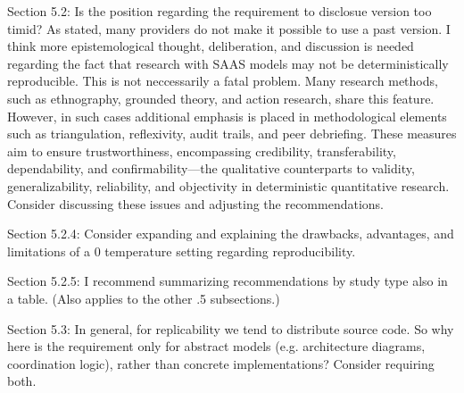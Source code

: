 \documentclass[12pt,english]{reviewresponse}
\begin{document}
\begin{revcomment}
Section 5.2: Is the position regarding the requirement to disclosue version too timid? As stated, many providers do not make it possible to use a past version. I think more epistemological thought, deliberation, and discussion is needed regarding the fact that research with SAAS models may not be deterministically reproducible.  This is not neccessarily a fatal problem. Many research methods, such as ethnography, grounded theory, and action research, share this feature. However, in such cases additional emphasis is placed in methodological elements such as triangulation, reflexivity, audit trails, and peer debriefing. These measures aim to ensure trustworthiness, encompassing credibility, transferability, dependability, and confirmability—the qualitative counterparts to validity, generalizability, reliability, and objectivity in deterministic quantitative research. Consider discussing these issues and adjusting the recommendations.
\end{revcomment}
\begin{revresponse}
\end{revresponse}

\begin{revcomment}
Section 5.2.4: Consider expanding and explaining the drawbacks, advantages, and limitations of a 0 temperature setting regarding reproducibility.
\end{revcomment}
\begin{revresponse}
\end{revresponse}

\begin{revcomment}
Section 5.2.5: I recommend summarizing recommendations by study type also in a table. (Also applies to the other .5 subsections.)
\end{revcomment}
\begin{revresponse}
\end{revresponse}

\begin{revcomment}
Section 5.3: In general, for replicability we tend to distribute source code. So why here is the requirement only for abstract models (e.g. architecture diagrams, coordination logic), rather than concrete implementations? Consider requiring both.
\end{revcomment}
\begin{revresponse}
\end{revresponse}
\end{document}
